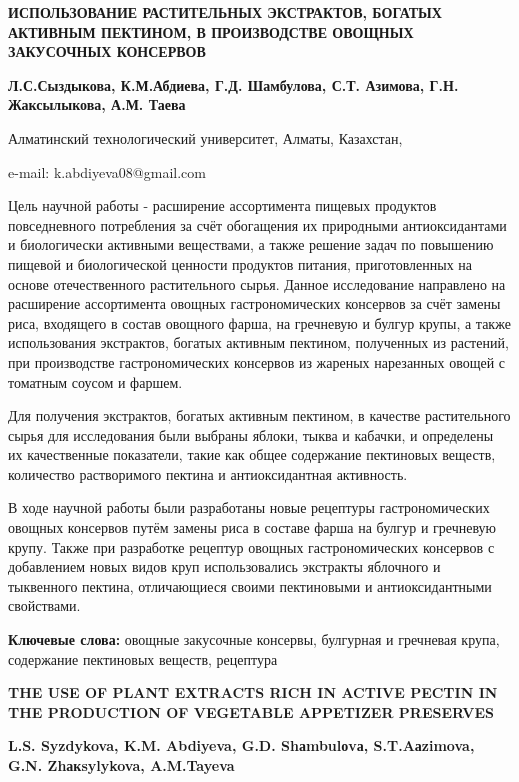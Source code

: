 \begin{articleheader}
{\bfseries ИСПОЛЬЗОВАНИЕ РАСТИТЕЛЬНЫХ ЭКСТРАКТОВ, БОГАТЫХ АКТИВНЫМ ПЕКТИНОМ, В ПРОИЗВОДСТВЕ ОВОЩНЫХ ЗАКУСОЧНЫХ КОНСЕРВОВ}

{\bfseries
Л.С.Сыздыкова,
К.М.Абдиева\textsuperscript{\envelope },
Г.Д. Шамбулова,
С.Т. Азимова,
Г.Н. Жаксылыкова,
А.М. Таева
}
\end{articleheader}

\begin{affiliation}
Алматинский технологический университет, Алматы, Казахстан,

e-mail: k.abdiyeva08@gmail.com
\end{affiliation}

Цель научной работы - расширение ассортимента пищевых продуктов
повседневного потребления за счёт обогащения их природными
антиоксидантами и биологически активными веществами, а также решение
задач по повышению пищевой и биологической ценности продуктов питания,
приготовленных на основе отечественного растительного сырья. Данное
исследование направлено на расширение ассортимента овощных
гастрономических консервов за счёт замены риса, входящего в состав
овощного фарша, на гречневую и булгур крупы, а также использования
экстрактов, богатых активным пектином, полученных из растений, при
производстве гастрономических консервов из жареных нарезанных овощей с
томатным соусом и фаршем.

Для получения экстрактов, богатых активным пектином, в качестве
растительного сырья для исследования были выбраны яблоки, тыква и
кабачки, и определены их качественные показатели, такие как общее
содержание пектиновых веществ, количество растворимого пектина и
антиоксидантная активность.

В ходе научной работы были разработаны новые рецептуры гастрономических
овощных консервов путём замены риса в составе фарша на булгур и
гречневую крупу. Также при разработке рецептур овощных гастрономических
консервов с добавлением новых видов круп использовались экстракты
яблочного и тыквенного пектина, отличающиеся своими пектиновыми и
антиоксидантными свойствами.

{\bfseries Ключевые слова:} овощные закусочные консервы, булгурная и
гречневая крупа, содержание пектиновых веществ, рецептура

\begin{articleheader}
{\bfseries THE USE OF PLANT EXTRACTS RICH IN ACTIVE PECTIN IN THE PRODUCTION OF VEGETABLE APPETIZER PRESERVES}

{\bfseries
L.S. Syzdykova,
K.M. Abdiyeva\textsuperscript{\envelope },
G.D. Shаmbulоvа,
S.T.Aаzimova,
G.N. Zhакsylykova,
A.M.Tayeva
}
\end{articleheader}

